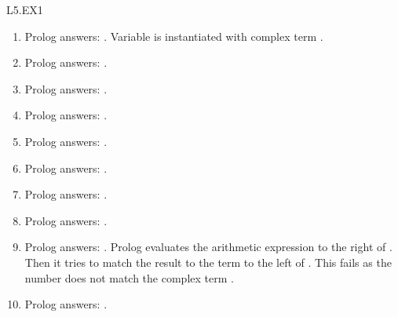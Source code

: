 \begin{mozartANSWER}{L5.EX1}\begin{enumerate}
\item{} Prolog answers: . Variable  is \mozartEMPTY
instantiated with complex term .
\item{} Prolog answers: .
\item{} Prolog answers: .
\item{} Prolog answers: .
\item{} Prolog answers: .
\item{} Prolog answers: .
\item{} Prolog answers: .
\item{} Prolog answers: .
\item{} Prolog answers: . Prolog evaluates \mozartEMPTY
the arithmetic expression to the right of . Then it tries to \mozartEMPTY
match the result to the term to the left of . This fails as \mozartEMPTY
the number  does not match the complex term .
\item{} Prolog answers: .

\end{enumerate}
\end{mozartANSWER}
